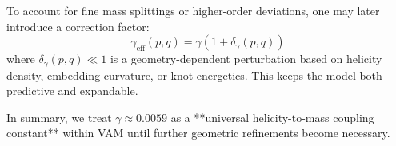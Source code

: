 \documentclass[12pt]{article}
\begin{document}
    To account for fine mass splittings or higher-order deviations, one may later introduce a correction factor:
    \[
        \gamma_{\text{eff}}(p,q) = \gamma \left( 1 + \delta_\gamma(p,q) \right)
    \]
    where \( \delta_\gamma(p,q) \ll 1 \) is a geometry-dependent perturbation based on helicity density, embedding curvature, or knot energetics. This keeps the model both predictive and expandable.

    In summary, we treat \( \gamma \approx 0.0059 \) as a **universal helicity-to-mass coupling constant** within VAM until further geometric refinements become necessary.
\end{document}
